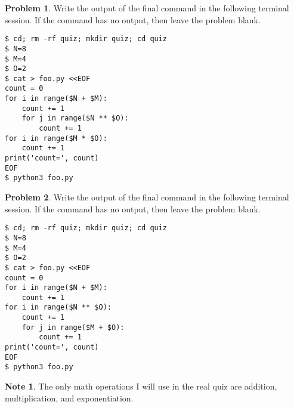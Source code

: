 \documentclass[10pt]{article}
\theoremstyle{definition}
\newtheorem{problem}{Problem}
\newtheorem{note}{Note}
\begin{document}
\filbreak
\begin{problem}
    Write the output of the final command in the following terminal session.
    If the command has no output, then leave the problem blank.
\end{problem}
\begin{lstlisting}
$ cd; rm -rf quiz; mkdir quiz; cd quiz
$ N=8
$ M=4
$ O=2
$ cat > foo.py <<EOF
count = 0
for i in range($N + $M):
    count += 1
    for j in range($N ** $O):
        count += 1
for i in range($M * $O):
    count += 1
print('count=', count)
EOF
$ python3 foo.py
\end{lstlisting}
\vspace{0.4in}

\filbreak
\begin{problem}
    Write the output of the final command in the following terminal session.
    If the command has no output, then leave the problem blank.
\end{problem}
\begin{lstlisting}
$ cd; rm -rf quiz; mkdir quiz; cd quiz
$ N=8
$ M=4
$ O=2
$ cat > foo.py <<EOF
count = 0
for i in range($N + $M):
    count += 1
for i in range($N ** $O):
    count += 1
    for j in range($M + $O):
        count += 1
print('count=', count)
EOF
$ python3 foo.py
\end{lstlisting}
\vspace{0.4in}

\filbreak

\begin{note}
    The only math operations I will use in the real quiz are addition, multiplication, and exponentiation.
\end{note}
\end{document}
